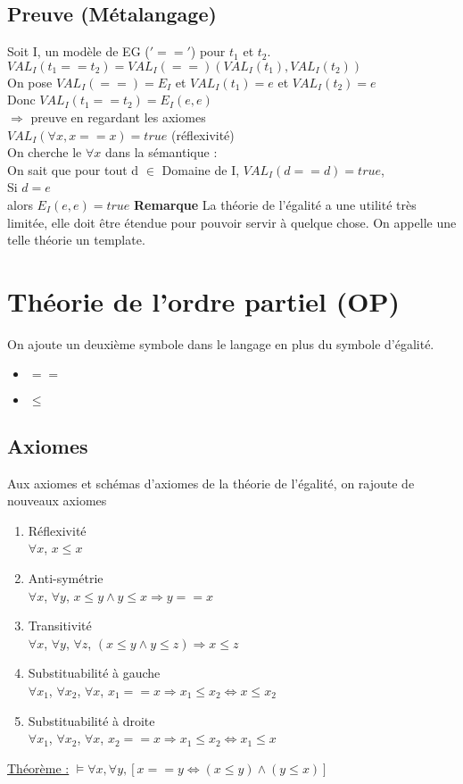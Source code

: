\subsection*{Preuve (Métalangage)}
\noindent Soit I, un modèle de EG ($'=='$) pour $t_{1}$ et $t_{2}$. \\
$VAL_{I}(t_{1} == t_{2}) = VAL_{I}(==)(VAL_{I}(t_{1}), VAL_{I}(t_{2}))$\\
On pose $VAL_{I}(==) = E_{I}$ et $VAL_{I}(t_{1}) = e$ et $VAL_{I}(t_{2}) = e$\\
Donc $VAL_{I}(t_{1} == t_{2}) =E_{I}(e,e)$ \\
$\Rightarrow$ preuve en regardant les axiomes \\
$ VAL_{I}(\forall x, x==x)= true$ (réflexivité) \\
On cherche le $\forall x$ dans la sémantique : \\
On sait que pour tout d $\in$ Domaine de I, $VAL_{I}(d==d)=true$, \\
Si $d = e$\\
alors $E_{I}(e,e)=true$
\textbf{Remarque}
La théorie de l'égalité a une utilité très limitée, elle doit être étendue pour pouvoir servir à quelque chose. On appelle une telle théorie un template.
\section{Théorie de l'ordre partiel (OP)}
On ajoute un deuxième symbole dans le langage en plus du symbole d'égalité.
\begin{itemize}
	\item $==$
	\item $\leq $
\end{itemize}

\subsection{Axiomes} 
Aux axiomes et schémas d'axiomes de la théorie de l'égalité, on rajoute de nouveaux axiomes
\begin{enumerate}
\item Réflexivité \\$\forall x$, $x\leq x$
\item Anti-symétrie \\$\forall x$, $\forall y$, $ x\leq y \land y\leq x\Rightarrow y==x$
\item Transitivité \\$\forall x$, $\forall y$, $\forall z$, $(x\leq y \land y\leq z) \Rightarrow x\leq z$
\item Substituabilité à gauche \\$\forall x_{1}$, $\forall x_{2}$, $\forall x$,  $x_{1}==x \Rightarrow x_{1}\leq x_{2} \Leftrightarrow x \leq x_{2}$
\item Substituabilité à droite \\$\forall x_{1}$, $\forall x_{2}$, $\forall x$,  $x_{2}==x \Rightarrow x_{1}\leq x_{2} \Leftrightarrow x_{1} \leq x$
\end{enumerate}
\underline{Théorème :} $\models \forall x, \forall y,  [x==y \Leftrightarrow (x\leq y)\land (y \leq x)] $
